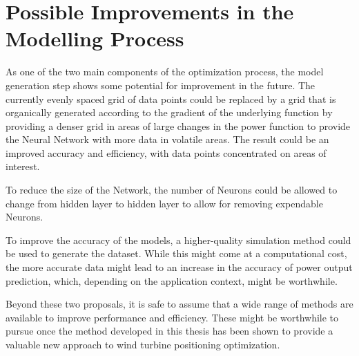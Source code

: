 \section{Possible Improvements in the Modelling Process}

As one of the two main components of the optimization process, the model generation step shows some potential for improvement in the future. The currently evenly spaced grid of data points could be replaced by a grid that is organically generated according to the gradient of the underlying function by providing a denser grid in areas of large changes in the power function to provide the Neural Network with more data in volatile areas. The result could be an improved accuracy and efficiency, with data points concentrated on areas of interest.   

To reduce the size of the Network, the number of Neurons could be allowed to change from hidden layer to hidden layer to allow for removing expendable Neurons. 

To improve the accuracy of the models, a higher-quality simulation method could be used to generate the dataset. While this might come at a computational cost, the more accurate data might lead to an increase in the  accuracy of power output prediction, which, depending on the application context, might be worthwhile.  

Beyond these two proposals, it is safe to assume that a wide range of methods are available to improve performance and efficiency. These might be worthwhile to pursue once the method developed in this thesis has been shown to provide a valuable new approach to wind turbine positioning optimization.
